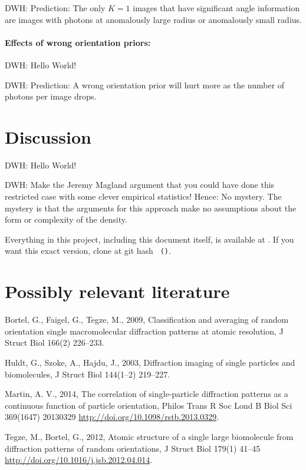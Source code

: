 \documentclass[12pt]{article}
\newcommand{\doi}[1]{\url{http://doi.org/#1}}
\begin{document}
DWH: Prediction: The only $K=1$ images that have significant angle
information are images with photons at anomalously large radius or
anomalously small radius.

\paragraph{Effects of wrong orientation priors:}
DWH: Hello World!

DWH: Prediction: A wrong orientation prior will hurt more as the
number of photons per image drops.

\section{Discussion}

DWH: Hello World!

DWH: Make the Jeremy Magland argument that you could have done this
restricted case with some clever empirical statistics!  Hence: No
mystery.  The mystery is that the arguments for this approach make no
assumptions about the form or complexity of the density.

\bigskip

Everything in this project, including this document itself, is
available at \giturl.  If you want this exact version, clone at git
hash \texttt{\githash~(\gitdate)}.

\section*{Possibly relevant literature}\raggedright
\begin{trivlist}
\item
Bortel, G., Faigel, G., Tegze, M., 2009,
Classification and averaging of random orientation single macromolecular diffraction patterns at atomic resolution,
J Struct Biol 166(2) 226--233.
\item
Huldt, G., Szoke, A., Hajdu, J., 2003,
Diffraction imaging of single particles and biomolecules,
J Struct Biol 144(1--2) 219--227.
\item
Martin, A. V., 2014,
The correlation of single-particle diffraction patterns as a continuous function of particle orientation,
Philos Trans R Soc Lond B Biol Sci 369(1647) 20130329
\doi{10.1098/rstb.2013.0329}.
\item
Tegze, M., Bortel, G., 2012,
Atomic structure of a single large biomolecule from diffraction patterns of random orientations,
J Struct Biol 179(1) 41--45
\doi{10.1016/j.jsb.2012.04.014}.
\end{trivlist}
\end{document}
